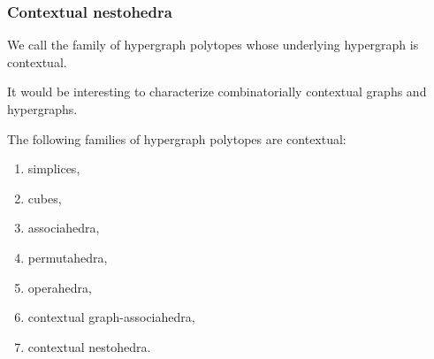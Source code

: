\subsubsection{Contextual nestohedra}
We call  the family of hypergraph polytopes whose underlying hypergraph is contextual. 

\begin{rem}
  It would be interesting to characterize combinatorially contextual graphs and hypergraphs.
\end{rem}



\begin{thm}
  \label{thm:examples}
  The following families of hypergraph polytopes are contextual:
  \begin{enumerate}
    \item simplices,
    \item cubes,
    \item associahedra,
    \item permutahedra,
    \item operahedra,
    \item contextual graph-associahedra,
    \item contextual nestohedra.
  \end{enumerate}
\end{thm}

